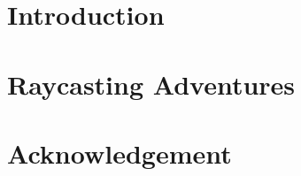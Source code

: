 \documentclass[12pt]{report}
\begin{document}

% 
% 


\tableofcontents
\newpage
\listoffigures
\newpage
\listoftables
\newpage

\chapter{Introduction}


\chapter{Raycasting Adventures}


\chapter{Acknowledgement}


\renewcommand{\bibname}{References}

%


\end{document}

